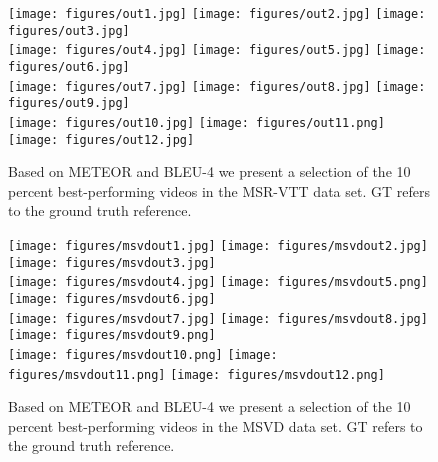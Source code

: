 \documentclass[runningheads,table]{llncs}
\begin{document}
\begin{figure*}

    \texttt{[image: figures/out1.jpg]}
    \texttt{[image: figures/out2.jpg]}
    \texttt{[image: figures/out3.jpg]}
    \\
    \texttt{[image: figures/out4.jpg]}
    \texttt{[image: figures/out5.jpg]}
    \texttt{[image: figures/out6.jpg]}
    \\
    \texttt{[image: figures/out7.jpg]}
    \texttt{[image: figures/out8.jpg]}
    \texttt{[image: figures/out9.jpg]}
    \\
    \texttt{[image: figures/out10.jpg]}
    \texttt{[image: figures/out11.png]}
    \texttt{[image: figures/out12.jpg]}
    \\
      
    \caption{Based on METEOR and BLEU-4 we present a selection of the 10 percent best-performing videos in the  MSR-VTT data set. GT refers to the ground truth reference.}\label{fig:best-out}
\end{figure*}

\begin{figure*}
    \centering

    \texttt{[image: figures/msvdout1.jpg]}
    \texttt{[image: figures/msvdout2.jpg]}
    \texttt{[image: figures/msvdout3.jpg]}
    \\
    \texttt{[image: figures/msvdout4.jpg]}
    \texttt{[image: figures/msvdout5.png]}
    \texttt{[image: figures/msvdout6.jpg]}
    \\
    \texttt{[image: figures/msvdout7.jpg]}
    \texttt{[image: figures/msvdout8.jpg]}
    \texttt{[image: figures/msvdout9.png]}
    \\
    \texttt{[image: figures/msvdout10.png]}
    \texttt{[image: figures/msvdout11.png]}
    \texttt{[image: figures/msvdout12.png]}
    \\
      
    \caption{Based on METEOR and BLEU-4 we present a selection of the 10 percent best-performing videos in the  MSVD data set. GT refers to the ground truth reference.
}
    \label{fig:best-outmsvd}
\end{figure*}
\end{document}
